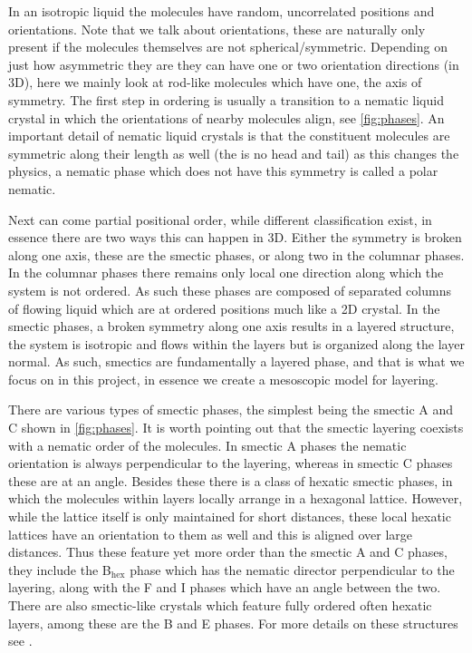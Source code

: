 \documentclass[12pt]{article}
\begin{document}
    In an isotropic liquid the molecules have random, uncorrelated positions and orientations.
    Note that we talk about orientations, these are naturally only present if the molecules themselves are not spherical/symmetric.
    Depending on just how asymmetric they are they can have one or two orientation directions (in 3D), here we mainly look at rod-like molecules which have one, the axis of symmetry.
    The first step in ordering is usually a transition to a nematic liquid crystal in which the orientations of nearby molecules align, see \cref{fig:phases}.
    An important detail of nematic liquid crystals is that the constituent molecules are symmetric along their length as well (the is no head and tail) as this changes the physics, a nematic phase which does not have this symmetry is called a polar nematic.

    Next can come partial positional order, while different classification exist, in essence there are two ways this can happen in 3D.
    Either the symmetry is broken along one axis, these are the smectic phases, or along two in the columnar phases\cite{oswaldNematicCholestericLiquid2005}.
    In the columnar phases there remains only local one direction along which the system is not ordered.
    As such these phases are composed of separated columns of flowing liquid which are at ordered positions much like a 2D crystal.
    In the smectic phases, a broken symmetry along one axis results in a layered structure, the system is isotropic and flows within the layers but is organized along the layer normal.
    As such, smectics are fundamentally a layered phase, and that is what we focus on in this project, in essence we create a mesoscopic model for layering.

    There are various types of smectic phases, the simplest being the smectic A and C shown in \cref{fig:phases}.
    It is worth pointing out that the smectic layering coexists with a nematic order of the molecules.
    In smectic A phases the nematic orientation is always perpendicular to the layering, whereas in smectic C phases these are at an angle.
    Besides these there is a class of hexatic smectic phases, in which the molecules within layers locally arrange in a hexagonal lattice.
    However, while the lattice itself is only maintained for short distances, these local hexatic lattices have an orientation to them as well and this is aligned over large distances.
    Thus these feature yet more order than the smectic A and C phases, they include the B$_\text{hex}$ phase which has the nematic director perpendicular to the layering, along with the F and I phases which have an angle between the two.
    There are also smectic-like crystals which feature fully ordered often hexatic layers, among these are the B and E phases.
    For more details on these structures see \cite{oswaldNematicCholestericLiquid2005,oswaldSmecticColumnarLiquid2005,gennesPhysicsLiquidCrystals1995}.
\end{document}
